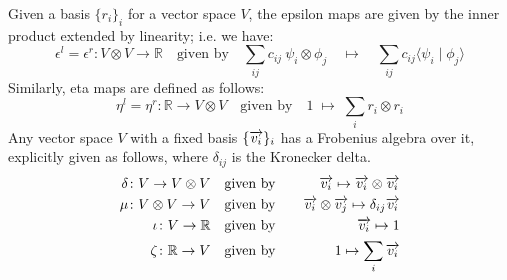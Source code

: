 %
Given a basis $\{r_i\}_i$ for a vector space $V$, the epsilon maps are
given by the inner product extended by linearity; i.e. we have:
\[
\epsilon^l  =  \epsilon^r \colon   V \otimes V \to \mathbb{R} \quad \mbox{given by} \quad
\sum_{ij} c_{ij} \ \psi_i \otimes \phi_j  \quad \mapsto \quad \sum_{ij} c_{ij} \langle \psi_i \mid \phi_j \rangle\]
Similarly, eta maps   are defined as follows:
\[
\eta^l = \eta^r \colon   \mathbb{R} \to V \otimes V
\quad \mbox{given by} \quad 
1 \; \mapsto \; \sum_i r_i \otimes r_i
\]
Any vector space $V$ with a fixed basis
$\{\overrightarrow{v_i}\}_i$ has a Frobenius algebra over it, explicitly given as follows, where $\delta_{ij}$ is the Kronecker delta.
\begin{eqnarray*}\label{eq:frob}
\delta  \colon V \to V \otimes V  & \quad \mbox{given by} \quad&  \overrightarrow{v_i} \mapsto \overrightarrow{v_i} \otimes \overrightarrow{v_i} \\
\mu \colon V \otimes V \to V  &\quad \mbox{given by} \quad & \overrightarrow{v_i} \otimes \overrightarrow{v_j} \mapsto 
\delta_{ij}\overrightarrow{v_i} \\
  \iota \colon V \to \mathbb{R} & \quad \mbox{given by} \quad&  \overrightarrow{v_i} \mapsto 1 \\
 \zeta \colon \mathbb{R} \to V  &\quad \mbox{given by} \quad& 1 \mapsto   \sum_i  \overrightarrow{v_i}  
\end{eqnarray*}




